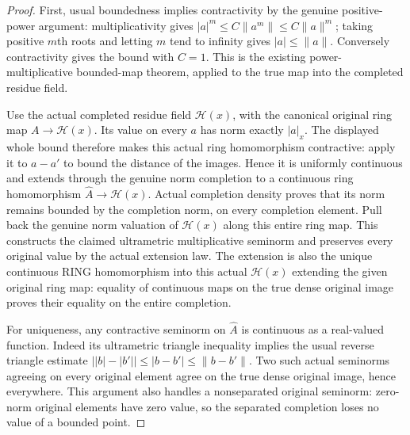 \begin{proof}
First, usual boundedness implies contractivity by the genuine
positive-power argument: multiplicativity gives
$|a|^m\leq C\|a^m\|\leq C\|a\|^m$; taking positive
$m$th roots and letting $m$ tend to infinity gives
$|a|\leq\|a\|$. Conversely contractivity gives the bound with
$C=1$. This is the existing power-multiplicative bounded-map theorem,
applied to the true map into the completed residue field.

Use the actual completed residue field $\mathcal H(x)$, with the
canonical original ring map $A\to\mathcal H(x)$. Its value on every
$a$ has norm exactly $|a|_x$. The displayed whole bound therefore
makes this actual ring homomorphism contractive: apply it to
$a-a'$ to bound the distance of the images. Hence it is uniformly
continuous and extends through the genuine norm completion to a
continuous ring homomorphism $\widehat A\to\mathcal H(x)$. Actual
completion density proves that its norm remains bounded by the
completion norm, on every completion element. Pull back the genuine
norm valuation of $\mathcal H(x)$ along this entire ring map.
This constructs the claimed ultrametric multiplicative seminorm
and preserves every original value by the actual extension law.
The extension is also the unique continuous RING homomorphism
into this actual $\mathcal H(x)$ extending the given original
ring map: equality of continuous maps on the true dense original
image proves their equality on the entire completion.

For uniqueness, any contractive seminorm on $\widehat A$ is
continuous as a real-valued function. Indeed its ultrametric
triangle inequality implies the usual reverse triangle estimate
$\bigl||b|-|b'|\bigr|\leq|b-b'|\leq\|b-b'\|$.
Two such actual seminorms agreeing on every original element agree
on the true dense original image, hence everywhere. This argument
also handles a nonseparated original seminorm: zero-norm original
elements have zero value, so the separated completion loses no
value of a bounded point.
\end{proof}

